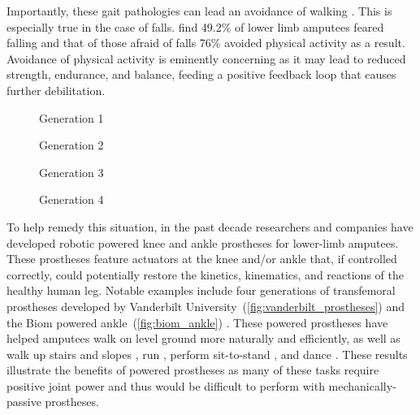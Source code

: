Importantly, these gait pathologies can lead an avoidance of walking
\citep{gauthier1999enabling}. This is especially true in the case of falls.
\citet{miller2001prevalence} find 49.2\% of lower limb amputees feared falling
and that of those afraid of falls 76\% avoided physical activity as a result.
Avoidance of physical activity is eminently concerning as it may lead to reduced
strength, endurance, and balance, feeding a positive feedback loop that causes
further debilitation.

\begin{marginfigure}
    \centering
    \caption{Biom Robotic Ankle Prosthesis}
    \label{fig:biom_ankle}
\end{marginfigure}

\begin{figure*}[b]
    \centering
	\begin{subfigure}[b]{0.2\textwidth}
    	\centering
        \caption{Generation 1}
	\end{subfigure}
	\begin{subfigure}[b]{0.2\textwidth}
    	\centering
        \caption{Generation 2}
	\end{subfigure}
	\begin{subfigure}[b]{0.2\textwidth}
    	\centering
        \caption{Generation 3}
	\end{subfigure}
	\begin{subfigure}[b]{0.2\textwidth}
    	\centering
        \caption{Generation 4}
	\end{subfigure}
    \caption{Vanderbilt University's Robotic Transfemoral
    Prostheses.\vspace{0.1in}}
    \label{fig:vanderbilt_prostheses}
\end{figure*}

To help remedy this situation, in the past decade researchers and companies have
developed robotic powered knee and ankle prostheses for lower-limb amputees.
These prostheses feature actuators at the knee and/or ankle that, if controlled
correctly, could potentially restore the kinetics, kinematics, and reactions
of the healthy human leg. Notable examples include four generations of
transfemoral prostheses developed by Vanderbilt
University~(\cref{fig:vanderbilt_prostheses}) \citep{sup2007design,
sup2009preliminary, lawson2013control, lawson2014robotic} and the Biom powered
ankle~(\cref{fig:biom_ankle}) \citep{herr2012bionic}. These powered prostheses
have helped amputees walk on level ground more naturally and efficiently, as
well as walk up stairs and slopes \citep{sup2011upslope, lawson2013control}, run
\citep{huff2012running, shultz2015running}, perform sit-to-stand
\citep{varol2009powered}, and dance \citep{rouse2015design}. These results
illustrate the benefits of powered prostheses as many of these tasks require
positive joint power and thus would be difficult to perform with
mechanically-passive prostheses.

